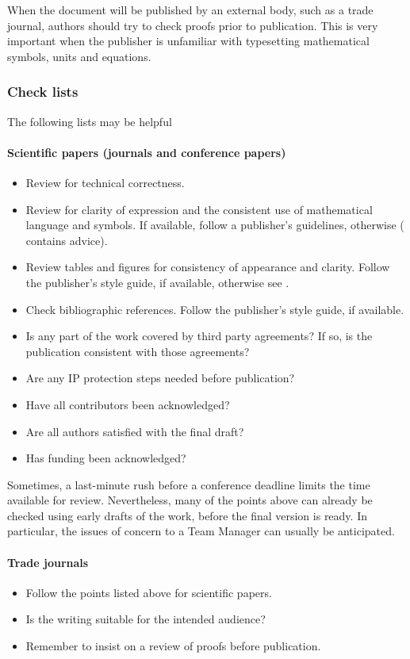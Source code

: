 When the document will be published by an external body, such as a trade journal, authors should try to check proofs prior to publication. This is very important when the publisher is unfamiliar with typesetting mathematical symbols, units and equations.  

\subsubsection{Check lists}
The following lists may be helpful
\paragraph{Scientific papers (journals and conference papers)}
\begin{itemize}
\item  Review for technical correctness.
\item  Review for clarity of expression and the consistent use of mathematical language and symbols.  If available, follow a publisher's guidelines, otherwise (\cite[\S\ref*{GRP-s:scientific_documents}]{MSL_Reporting_Guidelines} contains advice).
\item  Review tables and figures for consistency of appearance and clarity. Follow the publisher's style guide, if available, otherwise see \cite[\S\ref*{GRP-s:scientific_documents}]{MSL_Reporting_Guidelines}.
\item  Check bibliographic references. Follow the publisher's style guide, if available.
\item  Is any part of the work covered by third party agreements? If so, is the publication consistent with those agreements? 
\item  Are any IP protection steps needed before publication?
\item  Have all contributors been acknowledged?
\item  Are all authors satisfied with the final draft?
\item  Has funding been acknowledged?
\end{itemize}

Sometimes, a last-minute rush before a conference deadline limits the time available for review. Nevertheless, many of the points above can already be checked using early drafts of the work, before the final version is ready. In particular, the issues of concern to a Team Manager can usually be anticipated.

\paragraph{Trade journals}
\begin{itemize}
\item  Follow the points listed above for scientific papers.
\item  Is the writing suitable for the intended audience?
\item  Remember to insist on a review of proofs before publication.
\end{itemize} 

